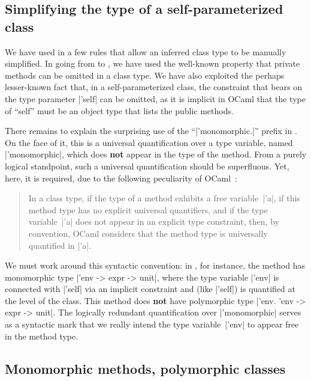 \documentclass[11pt,a4paper,twoside]{article}
\renewcommand{\emph}[1]{\textbf{#1}}
\begin{document}
\subsection{Simplifying the type of a self-parameterized class}
\label{sec:oo:monomorphic}

We have used in  a few rules that allow an inferred class
type to be manually simplified. In going from  to
, we have used the well-known property that private
methods can be omitted in a class type. We have also exploited the perhaps
lesser-known fact that, in a self-parameterized class, the constraint that
bears on the type parameter \oc|'self| can be omitted, as it is implicit in
OCaml that the type of ``self'' must be an object type that lists the public
methods.

There remains to explain the surprising use of the ``\oc|'monomorphic.|'' prefix
in . On the face of it, this is a universal
quantification over a type variable, named \oc|'monomorphic|, which does
\emph{not} appear in the type of the method. From a purely logical standpoint,
such a universal quantification should be superfluous. Yet, here, it is
required, due to the following peculiarity of OCaml~\cite{ocaml7465}:
\begin{quote}
  In a class type,
  if the type of a method exhibits a free variable~\oc|'a|,
  if this method type has no explicit universal quantifiers,
  and if the type variable~\oc|'a| does not appear in an explicit type constraint,
  then, by convention,
  OCaml considers that the method type is universally quantified in \oc|'a|.
\end{quote}
We must work around this syntactic convention: in , for
instance, the method  has monomorphic type %
\oc|'env -> expr -> unit|, where the type variable \oc|'env| is connected with
\oc|'self| via an implicit constraint and (like \oc|'self|) is quantified at
the level of the class. This method does \emph{not} have polymorphic type %
\oc|'env. 'env -> expr -> unit|. The logically redundant quantification over
\oc|'monomorphic| serves as a syntactic mark that we really intend the type
variable~\oc|'env| to appear free in the method type.


\subsection{Monomorphic methods, polymorphic classes}
\end{document}
